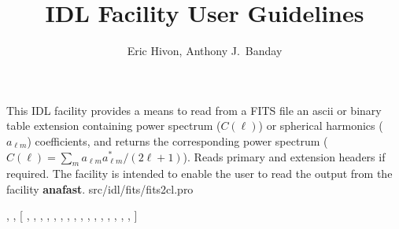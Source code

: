

\sloppy

\title{\healpix IDL Facility User Guidelines}
 \section[fits2cl]{ }
\label{idl:fits2cl}
\author{Eric Hivon, Anthony J.~Banday}

\begin{facility}
{This IDL facility provides a means to
read from a FITS file an ascii or binary table extension containing power 
spectrum ($C(\ell)$) or spherical harmonics ($a_{\ell m}$) coefficients, and returns
the corresponding power spectrum ($C(\ell) = \sum_m a_{\ell m}a^*_{\ell m} / (2\ell+1)$). Reads primary and extension headers if
required. The facility is intended to enable the user to read the
output from the \healpix facility \textbf{anafast}.
}
{src/idl/fits/fits2cl.pro}
\end{facility}

\begin{IDLformat}
{\thedocid, 
, 
[%
, %
 ,
 ,
, 
, 
, 
,  
, 
, 
, 
, 
, 
, 
, 
, 
, 
%
]}
\end{IDLformat}

